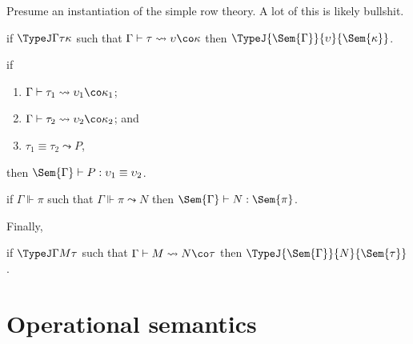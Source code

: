 \documentclass[authoryear,acmsmall,screen]{acmart}
\newcommand\SortJ[3]{\TypeJ {#1} {#2} {#3}}
\newcommand\Ixed[1]{\ensuremath{\Sem{#1}}}
\begin{document}
Presume an \RO instantiation of the simple row theory. A lot of this is likely bullshit.

\begin{theorem}
  if $\TypeJ \Gamma \tau \kappa$ such that $\Gamma \vdash \tau \leadsto \upsilon \co \kappa$ then $\SortJ {\Ixed{\Gamma}} \upsilon {\Ixed{\kappa}}$.
\end{theorem}

\begin{theorem}
  if
  \begin{enumerate}
  \item $\Gamma \vdash \tau_{1} \leadsto \upsilon_{1} \co \kappa_{1}$;
  \item $\Gamma \vdash \tau_{2} \leadsto \upsilon_{2} \co \kappa_{2}$; and
  \item $\tau_{1} \equiv \tau_{2} \leadsto P$,
  \end{enumerate}
 then $\Ixed{\Gamma} \vdash P : \upsilon_{1} \equiv \upsilon_{2}$.
\end{theorem}

\begin{theorem}
  if $\Gamma \Vdash \pi$ such that $\Gamma \Vdash \pi \leadsto N$ then $\Ixed{\Gamma} \vdash N : \Ixed{\pi}$.
\end{theorem}

Finally,

\begin{theorem}
  if $\TypeJ \Gamma M \tau$ such that $\Gamma \vdash M \leadsto N \co \tau$ then $\SortJ {\Ixed{\Gamma}} N {\Ixed{\tau}}$.
\end{theorem}


\section{Operational semantics}




\end{document}
